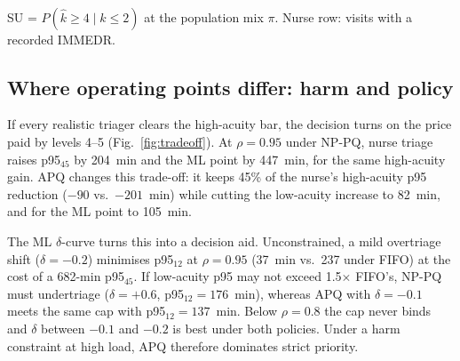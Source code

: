 \documentclass[conference]{IEEEtran}
\begin{document}
\begin{table}[t]
\caption{Classifiers vs.\ rESI-O on the 2021--2022 test years (bootstrap 95\% CIs).}
\label{tab:clf}
\centering\footnotesize
\setlength{\tabcolsep}{2.5pt}
\\[2pt]\raggedright\scriptsize SU = $P(\hat k\ge4\mid k\le2)$ at the population mix $\pi$.
Nurse row: visits with a recorded IMMEDR.
\end{table}

\subsection{Where operating points differ: harm and policy}
If every realistic triager clears the high-acuity bar, the decision turns on the price
paid by levels 4--5 (Fig.~\ref{fig:tradeoff}). At $\rho=0.95$ under NP-PQ, nurse triage
raises p95$_{45}$ by 204~min and the ML point by 447~min, for the same high-acuity gain.
APQ changes this trade-off: it keeps 45\% of the nurse's high-acuity p95 reduction
($-90$ vs.\ $-201$~min) while cutting the low-acuity increase to 82~min, and for the ML
point to 105~min.

The ML $\delta$-curve turns this into a decision aid. Unconstrained, a mild overtriage
shift ($\delta=-0.2$) minimises p95$_{12}$ at $\rho=0.95$ (37~min vs.\ 237 under FIFO) at
the cost of a 682-min p95$_{45}$. If low-acuity p95 may not exceed 1.5$\times$ FIFO's, NP-PQ
must undertriage ($\delta=+0.6$, p95$_{12}=176$~min), whereas APQ with $\delta=-0.1$ meets the
same cap with p95$_{12}=137$~min. Below $\rho=0.8$ the cap never binds and $\delta$ between
$-0.1$ and $-0.2$ is best under both policies. Under a harm constraint at high load, APQ
therefore dominates strict priority.
\end{document}

